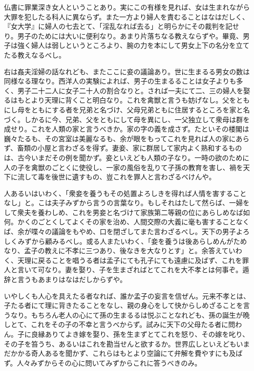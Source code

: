 \documentclass[a4paper, platex, dvipdfmx]{jsarticle}
\begin{document}
仏書に罪業深き女人ということあり。実にこの有様を見れば、女は生まれながら大罪を犯したる科人に異ならず。また一方より婦人を責むることはなはだしく、『女大学』に婦人の七去とて、「淫乱なれば去る」と明らかにその裁判を記せり。男子のためには大いに便利なり。あまり片落ちなる教えならずや。畢竟、男子は強く婦人は弱しというところより、腕の力を本にして男女上下の名分を立てたる教えなるべし。

右は姦夫淫婦の話なれども、またここに妾の議論あり。世に生まるる男女の数は同様なる理なり。西洋人の実験によれば、男子の生まるることは女子よりも多く、男子二十二人に女子二十人の割合なりと。されば一夫にて二、三の婦人を娶るはもとより天理に背くこと明白なり。これを禽獣と言うも妨げなし。父をともにし母をともにする者を兄弟と名づけ、父母兄弟ともに住居するところを家と名づく。しかるに今、兄弟、父をともにして母を異にし、一父独立して衆母は群を成せり。これを人類の家と言うべきか。家の字の義を成さず。たといその楼閣は巍々たるも、その宮室は美麗なるも、余が眼をもってこれを見れば人の家にあらず、畜類の小屋と言わざるを得ず。妻妾、家に群居して家内よく熟和するものは、古今いまだその例を聞かず。妾といえども人類の子なり。一時の欲のために人の子を禽獣のごとくに使役し、一家の風俗を乱りて子孫の教育を害し、禍を天下に流して毒を後世に遺すもの、豈これを罪人と言わざるべけんや。

人あるいはいわく、「衆妾を養うもその処置よろしきを得れば人情を害することなし」と。こは夫子みずから言うの言葉なり。もしそれはたして然らば、一婦をして衆夫を養わしめ、これを男妾と名づけて家族第二等親の位にあらしめなば如何。かくのごとくしてよくその家を治め、人間交際の大義に毫も害することなくば、余が喋々の議論をもやめ、口を閉ざしてまた言わざるべし。天下の男子よろしくみずから顧みるべし。或る人またいわく、「妾を養うは後あらしめんがためなり、孟子の教えに不孝に三つあり、後なきを大なりとす」と。余答えていわく、天理に戻ることを唱うる者は孟子にても孔子にても遠慮に及ばず、これを罪人と言いて可なり。妻を娶り、子を生まざればとてこれを大不孝とは何事ぞ。遁辞と言うもあまりはなはだしからずや。

いやしくも人心を具えたる者なれば、誰か孟子の妄言を信ぜん。元来不孝とは、子たる者にて理に背きたることをなし、親の身心をして快からしめざることを言うなり。もちろん老人の心にて孫の生まるるは悦ぶことなれども、孫の誕生が晩しとて、これをその子の不幸と言うべからず。試みに天下の父母たる者に問わん。子に良縁ありてよき嫁を娶り、孫を生まずとてこれを怒り、その嫁を叱り、その子を笞うち、あるいはこれを勘当せんと欲するか。世界広しといえどもいまだかかる奇人あるを聞かず、これらはもとより空論にて弁解を費やすにも及ばず。人々みずからその心に問いてみずからこれに答うべきのみ。
\end{document}
